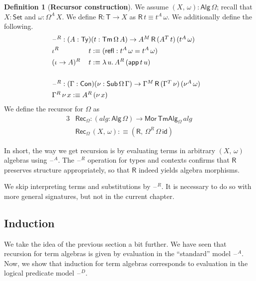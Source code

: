 \documentclass[12pt,a4paper,twoside,openany]{book}
\theoremstyle{remark}
\theoremstyle{definition}
\newtheorem{mydefinition}{Definition}
\newcommand{\mi}[1]{\mathit{#1}}
\newcommand{\ms}[1]{\mathsf{#1}}
\newcommand{\refl}{\mathsf{refl}}
\newcommand{\id}{\mathsf{id}}
\newcommand{\Con}{\mathsf{Con}}
\newcommand{\Sub}{\mathsf{Sub}}
\newcommand{\Tm}{\mathsf{Tm}}
\newcommand{\Ty}{\mathsf{Ty}}
\newcommand{\blank}{\mathord{\hspace{1pt}\text{--}\hspace{1pt}}}
\newcommand{\Set}{\mathsf{Set}}
\newcommand{\app}{\ms{app}}
\newcommand{\Alg}{\ms{Alg}}
\newcommand{\Mor}{\ms{Mor}}
\newcommand{\TmAlg}{\ms{TmAlg}}
\newcommand{\Rec}{\ms{Rec}}
\newcommand{\defn}{:\equiv}
\begin{document}
\begin{mydefinition}[\textbf{Recursor construction}] We assume $(X,\,\omega) : \Alg\,\Omega$;
recall that $X : \Set$ and $\omega : \Omega^A\,X$. We define $\ms{R} : \ms{T} \to X$
as $\ms{R}\,t \equiv t^A\,\omega$. We additionally define the following.
\begin{alignat*}{3}
& \hspace{-6em}\rlap{$\blank^R : (A : \Ty)(t : \Tm\,\Omega\,A) \to A^M\,\ms{R}\,(A^T\,t)\,(t^A\,\omega)$}\\
& \hspace{-6em}\iota^R\,&&t \defn (\refl : t^A\,\omega = t^A\,\omega)\\
& \hspace{-6em}(\iota\to A)^R\,&&t \defn \lambda\,u.\,A^R\,(\app\,t\,u)\\
& \hspace{-6em}&& \\
& \hspace{-6em}\rlap{$\blank^R : (\Gamma : \Con)(\nu : \Sub\,\Omega\,\Gamma) \to \Gamma^M\,\ms{R}\,(\Gamma^T\,\nu)\,(\nu^A\,\omega)$}\\
& \hspace{-6em}\rlap{$\Gamma^R\,\nu\,x \defn A^R\,(\nu\,x)$}
\end{alignat*}
We define the recursor for $\Omega$ as
\begin{alignat*}{3}
  & \Rec_{\Omega} : (\mi{alg} : \Alg\,\Omega) \to \Mor\,\TmAlg_{\Omega}\,\mi{alg}\\
  & \Rec_{\Omega}\,(X,\,\omega) \defn (\ms{R},\,\Omega^R\,\Omega\,\id)
\end{alignat*}
\end{mydefinition}

In short, the way we get recursion is by evaluating terms in arbitrary
$(X,\,\omega)$ algebras using $\blank^A$. The $\blank^R$ operation for types and
contexts confirms that $\ms{R}$ preserves structure appropriately, so that
$\ms{R}$ indeed yields algebra morphisms.

We skip interpreting terms and substitutions by $\blank^R$. It is necessary to
do so with more general signatures, but not in the current chapter.

\subsection{Induction}

We take the idea of the previous section a bit further. We have seen that
recursion for term algebras is given by evaluation in the ``standard'' model
$\blank^A$. Now, we show that induction for term algebras corresponds to
evaluation in the logical predicate model $\blank^D$.
\end{document}
